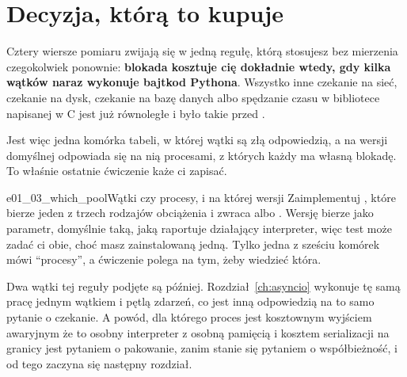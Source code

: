 \section{Decyzja, którą to kupuje}
\label{sec:ch01-decision}

\noindent
Cztery wiersze pomiaru zwijają się w jedną regułę, którą stosujesz bez
mierzenia czegokolwiek ponownie: \textbf{blokada kosztuje cię dokładnie
wtedy, gdy kilka wątków naraz wykonuje bajtkod Pythona}. Wszystko inne
\dash{} czekanie na sieć, czekanie na dysk, czekanie na bazę danych albo
spędzanie czasu w bibliotece napisanej w C \dash{} jest już równoległe i było
takie przed \pyver{}.

Jest więc jedna komórka tabeli, w której wątki są złą odpowiedzią, a na
wersji domyślnej odpowiada się na nią procesami, z których każdy ma własną
blokadę. To właśnie ostatnie ćwiczenie każe ci zapisać.

\begin{exercise}{e01_03_which_pool}{Wątki czy procesy, i na której wersji}
Zaimplementuj , które bierze jeden z trzech rodzajów
obciążenia i zwraca  albo . Wersję bierze
jako parametr, domyślnie taką, jaką raportuje działający interpreter, więc
test może zadać ci obie, choć masz zainstalowaną jedną. Tylko jedna z sześciu
komórek mówi \enquote{procesy}, a ćwiczenie polega na tym, żeby wiedzieć
która.
\end{exercise}

\noindent
Dwa wątki tej reguły podjęte są później. Rozdział~\ref{ch:asyncio} wykonuje
tę samą pracę jednym wątkiem i pętlą zdarzeń, co jest inną odpowiedzią na to
samo pytanie o czekanie. A powód, dla którego proces jest kosztownym wyjściem
awaryjnym \dash{} że to osobny interpreter z osobną pamięcią i kosztem
serializacji na granicy \dash{} jest pytaniem o pakowanie, zanim stanie się
pytaniem o współbieżność, i od tego zaczyna się następny rozdział.
